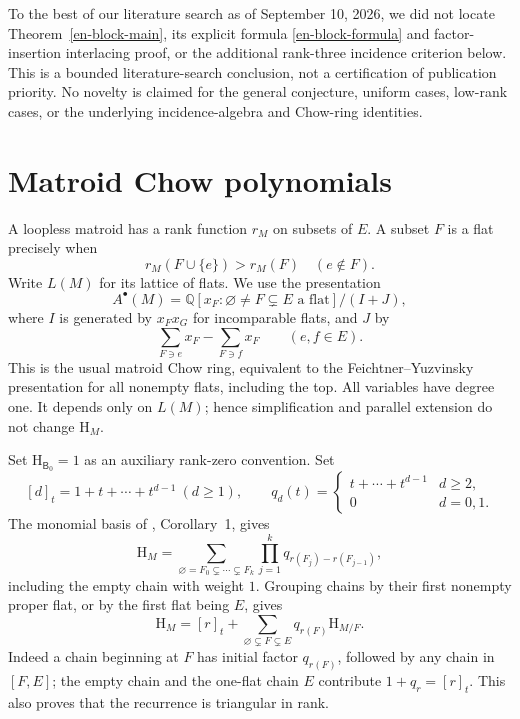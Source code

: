 \documentclass[12pt]{amsart}
\theoremstyle{definition}
\theoremstyle{remark}
\numberwithin{equation}{section}
\newcommand{\Q}{\mathbb{Q}}
\newcommand{\HCh}{\mathrm{H}}
\newcommand{\Bmat}{\mathsf{B}}
\begin{document}
To the best of our literature search as of September 10, 2026, we did not locate Theorem~\ref{en-block-main}, its explicit formula \eqref{en-block-formula} and factor-insertion interlacing proof, or the additional rank-three incidence criterion below. This is a bounded literature-search conclusion, not a certification of publication priority. No novelty is claimed for the general conjecture, uniform cases, low-rank cases, or the underlying incidence-algebra and Chow-ring identities.

\section{Matroid Chow polynomials}
A loopless matroid has a rank function $r_M$ on subsets of $E$. A subset $F$ is a flat precisely when
\[
 r_M(F\cup\{e\})>r_M(F)\quad(e\notin F).
\]
Write $L(M)$ for its lattice of flats. We use the presentation
\[
 A^\bullet(M)=\Q[x_F:\varnothing\ne F\subsetneq E\text{ a flat}]/(I+J),
\]
where $I$ is generated by $x_Fx_G$ for incomparable flats, and $J$ by
\[
 \sum_{F\ni e}x_F-\sum_{F\ni f}x_F\qquad(e,f\in E).
\]
This is the usual matroid Chow ring, equivalent to the Feichtner--Yuzvinsky presentation for all nonempty flats, including the top. All variables have degree one. It depends only on $L(M)$; hence simplification and parallel extension do not change $\HCh_M$.

Set $\HCh_{\Bmat_0}=1$ as an auxiliary rank-zero convention. Set
\[
 [d]_t=1+t+\cdots+t^{d-1}\ (d\geq1),\qquad
 q_d(t)=\begin{cases}t+\cdots+t^{d-1}&d\geq2,\\0&d=0,1.\end{cases}
\]
The monomial basis of \cite{FY04}, Corollary~1, gives
\begin{equation}\label{en-chain}
 \HCh_M=\sum_{\varnothing=F_0\subsetneq\cdots\subsetneq F_k}
          \prod_{j=1}^k q_{r(F_j)-r(F_{j-1})},
\end{equation}
including the empty chain with weight $1$. Grouping chains by their first nonempty proper flat, or by the first flat being $E$, gives
\begin{equation}\label{en-positive}
 \HCh_M=[r]_t+
 \sum_{\varnothing\subsetneq F\subsetneq E}q_{r(F)}\HCh_{M/F}.
\end{equation}
Indeed a chain beginning at $F$ has initial factor $q_{r(F)}$, followed by any chain in $[F,E]$; the empty chain and the one-flat chain $E$ contribute $1+q_r=[r]_t$. This also proves that the recurrence is triangular in rank.
\end{document}
